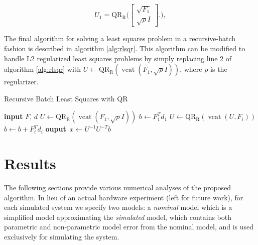 \documentclass{article}
\begin{document}
\begin{equation}
    U_1 =  \operatorname{QR_R}\bigg( 
        \begin{bmatrix} \sqrt{F_1} \\ \sqrt{\rho} I \end{bmatrix}.
    \bigg),
\end{equation}

The final algorithm for solving a least squares problem in a recursive-batch fashion is
described in algorithm \ref{alg:rlsqr}. This algorithm can be modified to handle L2
regularized least squares problems by simply replacing line 2 of algorithm \ref{alg:rlsqr}
with $U\leftarrow \operatorname{QR_R}(\operatorname{vcat}(F_1,\sqrt{\rho}I))$, where $\rho$
is the regularizer. 
 \begin{algorithm} 
    \begin{algorithmic}[1]
        \caption{Recursive Batch Least Squares with QR}\label{alg:rlsqr}
        \State \textbf{input} $F,\,d$  
        \State $U \leftarrow \operatorname{QR_R}(\operatorname{vcat}(F_1,\sqrt{\rho}I))$ 
        \State $b \leftarrow F_1^Td_1$ 
        \State $U \leftarrow \operatorname{QR_R}(\operatorname{vcat}(U,F_i)) $ 
        \State $b \leftarrow b + F_i^Td_i$ 
        \EndFor
        \State \textbf{ouput} \,$x \leftarrow U^{-1}U^{-T}b$ 
    \end{algorithmic}
\end{algorithm}

\section{Results} \label{sec:results}
The following sections provide various numerical analyses of the proposed algorithm. 
In lieu of an actual hardware experiment (left for future work), for each simulated system 
we specify two models: a \textit{nominal} model which is a simplified model approximating 
the \textit{simulated} model, which contains both parametric and non-parametric model 
error from the nominal model, and is used exclusively for simulating the system.
\end{document}
